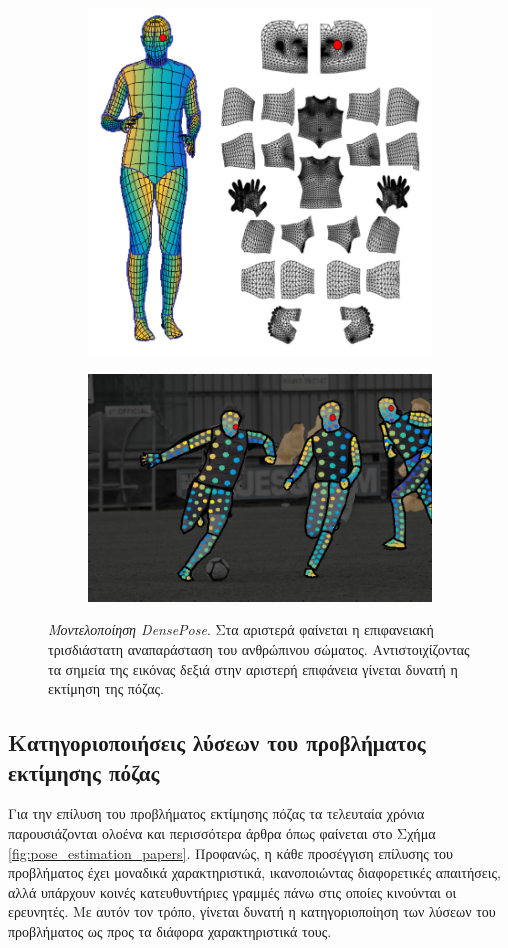 \begin{figure}[h]
    \centering
    \begin{subfigure}{.5\linewidth}
        \centering
        \includegraphics[width=.4\linewidth]{images/chapter2/3d_pose_estimation/densepose_model.png}
    \end{subfigure}%
    \begin{subfigure}{.5\linewidth}
        \centering
        \includegraphics[width=.4\linewidth]{images/chapter2/3d_pose_estimation/densepose_result_football.png}
    \end{subfigure}
    \caption[Μοντελοποίηση DensePose]{\textsl{Μοντελοποίηση DensePose}. Στα αριστερά φαίνεται η επιφανειακή τρισδιάστατη αναπαράσταση του ανθρώπινου σώματος. Αντιστοιχίζοντας τα σημεία της εικόνας δεξιά στην αριστερή επιφάνεια γίνεται δυνατή η εκτίμηση της πόζας.}
    \label{fig:densepose_correspondence}
\end{figure}

\subsection{Κατηγοριοποιήσεις λύσεων του προβλήματος εκτίμησης πόζας}

Για την επίλυση του προβλήματος εκτίμησης πόζας τα τελευταία χρόνια παρουσιάζονται ολοένα και περισσότερα άρθρα όπως φαίνεται στο Σχήμα \ref{fig:pose_estimation_papers}. Προφανώς, η κάθε προσέγγιση επίλυσης του προβλήματος έχει μοναδικά χαρακτηριστικά, ικανοποιώντας διαφορετικές απαιτήσεις, αλλά υπάρχουν κοινές κατευθυντήριες γραμμές πάνω στις οποίες κινούνται οι ερευνητές. Με αυτόν τον τρόπο, γίνεται δυνατή η κατηγοριοποίηση των λύσεων του προβλήματος ως προς τα διάφορα χαρακτηριστικά τους.

